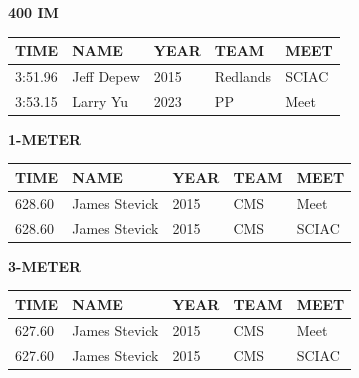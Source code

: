 \begin{table}[H]
\centering
\begin{minipage}[t]{0.6\textwidth}
\centering
\textbf{400 IM}\\[0.1cm]
\begin{tabular}{@{}p{1.8cm}p{2.8cm}p{1.2cm}p{1.4cm}p{1.4cm}@{}}
\hline
    \textbf{TIME} & \textbf{NAME} & \textbf{YEAR} & \textbf{TEAM} & \textbf{MEET} \\
\hline
    3:51.96 & Jeff Depew & 2015 & Redlands & SCIAC \\
    3:53.15 & Larry Yu & 2023 & PP & Meet \\
\hline
\end{tabular}
\end{minipage}
\end{table}

\begin{table}[H]
\centering
\begin{minipage}[t]{0.6\textwidth}
\centering
\textbf{1-METER}\\[0.1cm]
\begin{tabular}{@{}p{1.8cm}p{2.8cm}p{1.2cm}p{1.4cm}p{1.4cm}@{}}
\hline
    \textbf{TIME} & \textbf{NAME} & \textbf{YEAR} & \textbf{TEAM} & \textbf{MEET} \\
\hline
    628.60 & James Stevick & 2015 & CMS & Meet \\
    628.60 & James Stevick & 2015 & CMS & SCIAC \\
\hline
\end{tabular}
\end{minipage}
\end{table}

\begin{table}[H]
\centering
\begin{minipage}[t]{0.6\textwidth}
\centering
\textbf{3-METER}\\[0.1cm]
\begin{tabular}{@{}p{1.8cm}p{2.8cm}p{1.2cm}p{1.4cm}p{1.4cm}@{}}
\hline
    \textbf{TIME} & \textbf{NAME} & \textbf{YEAR} & \textbf{TEAM} & \textbf{MEET} \\
\hline
    627.60 & James Stevick & 2015 & CMS & Meet \\
    627.60 & James Stevick & 2015 & CMS & SCIAC \\
\hline
\end{tabular}
\end{minipage}
\end{table}


